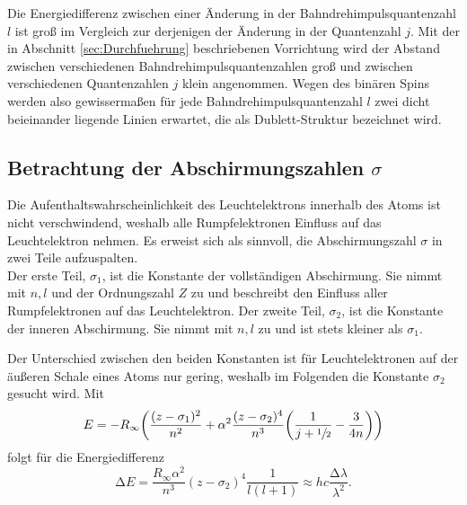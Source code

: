 Die Energiedifferenz zwischen einer Änderung in der Bahndrehimpulsquantenzahl $l$ ist groß im Vergleich zur derjenigen der Änderung in der Quantenzahl $j$.
Mit der in Abschnitt \ref{sec:Durchfuehrung} beschriebenen Vorrichtung wird der Abstand zwischen verschiedenen Bahndrehimpulsquantenzahlen groß und zwischen verschiedenen Quantenzahlen $j$ klein angenommen.
Wegen des binären Spins werden also gewissermaßen für jede Bahndrehimpulsquantenzahl $l$ zwei dicht beieinander liegende Linien erwartet, die als Dublett-Struktur bezeichnet wird.

\subsection{Betrachtung der Abschirmungszahlen \texorpdfstring{$\sigma$}{Sigma}}
Die Aufenthaltswahrscheinlichkeit des Leuchtelektrons innerhalb des Atoms ist nicht verschwindend, weshalb alle Rumpfelektronen Einfluss auf das Leuchtelektron nehmen.
Es erweist sich als sinnvoll, die Abschirmungszahl $\sigma$ in zwei Teile aufzuspalten.\\
Der erste Teil, $\sigma_1$, ist die Konstante der vollständigen Abschirmung. 
Sie nimmt mit $n,l$ und der Ordnungszahl $Z$ zu und beschreibt den Einfluss aller Rumpfelektronen auf das Leuchtelektron.
Der zweite Teil, $\sigma_2$, ist die Konstante der inneren Abschirmung. 
Sie nimmt mit $n,l$ zu und ist stets kleiner als $\sigma_1$.

Der Unterschied zwischen den beiden Konstanten ist für Leuchtelektronen auf der äußeren Schale eines Atoms nur gering, weshalb im Folgenden die Konstante $\sigma_2$ gesucht wird.
Mit
\begin{equation}
	E=-R_\infty\biggl(\frac{(z-\sigma_1)^2}{n^2}+\alpha^2\frac{(z-\sigma_2)^4}{n^3}\biggl(\frac{1}{j+\sfrac{1}{2}}-\frac{3}{4n}\biggr) \biggr)
\end{equation}
folgt für die Energiedifferenz
\begin{equation}
	\mathup{\Delta}E=\frac{R_\infty\alpha^2}{n^3}(z-\sigma_2)^4\frac{1}{l(l+1)}\approx hc\frac{\mathup{\Delta}\lambda}{\lambda^2}.
\label{delta_E}
\end{equation}
